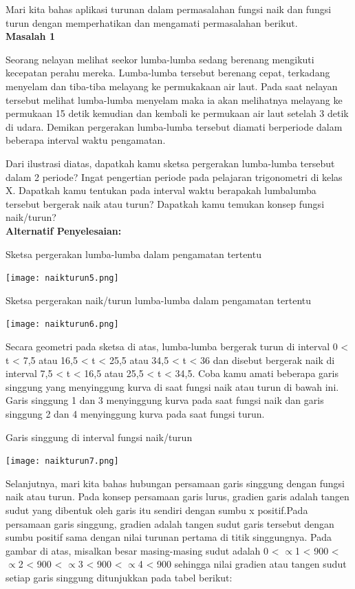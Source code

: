 \documentclass[11pt,fleqn]{book} %
\begin{document}
Mari kita bahas aplikasi turunan dalam permasalahan fungsi naik dan fungsi turun dengan memperhatikan dan mengamati permasalahan berikut.\\

\textbf{Masalah 1}

Seorang nelayan melihat seekor lumba-lumba sedang berenang mengikuti kecepatan perahu mereka. Lumba-lumba tersebut berenang cepat, terkadang menyelam dan tiba-tiba melayang ke permukakaan air laut. Pada saat nelayan tersebut melihat lumba-lumba menyelam maka ia akan melihatnya melayang ke permukaan 15 detik kemudian dan kembali ke permukaan air laut setelah 3 detik di udara. Demikan pergerakan lumba-lumba tersebut diamati berperiode dalam beberapa interval waktu pengamatan.

Dari ilustrasi diatas, dapatkah kamu sketsa pergerakan lumba-lumba tersebut dalam 2 periode? Ingat pengertian periode pada pelajaran trigonometri di kelas X. Dapatkah kamu tentukan pada interval waktu berapakah lumbalumba tersebut bergerak naik atau turun? Dapatkah kamu temukan konsep fungsi naik/turun?\\

\textbf{Alternatif Penyelesaian:}

Sketsa pergerakan lumba-lumba dalam pengamatan tertentu

\texttt{[image: naikturun5.png]}

Sketsa pergerakan naik/turun lumba-lumba dalam pengamatan tertentu

\texttt{[image: naikturun6.png]}

Secara geometri pada sketsa di atas, lumba-lumba bergerak turun di interval 0 < t < 7,5 atau 16,5 < t < 25,5 atau 34,5 < t < 36 dan disebut bergerak naik di interval 7,5 < t < 16,5 atau 25,5 < t < 34,5.
Coba kamu amati beberapa garis singgung yang menyinggung kurva di saat fungsi naik atau turun di bawah ini. Garis singgung 1 dan 3 menyinggung kurva pada saat fungsi naik dan garis singgung 2 dan 4 menyinggung kurva pada saat fungsi turun.

Garis singgung di interval fungsi naik/turun

\texttt{[image: naikturun7.png]}

Selanjutnya, mari kita bahas hubungan persamaan garis singgung dengan fungsi naik atau turun. Pada konsep
persamaan garis lurus, gradien garis adalah tangen sudut yang dibentuk oleh garis itu sendiri dengan sumbu x positif.Pada persamaan garis singgung, gradien adalah tangen sudut garis tersebut dengan sumbu positif sama dengan nilai turunan pertama di titik singgungnya. Pada gambar di atas, misalkan besar masing-masing sudut adalah 0 < $\propto $1 < 900 < $\propto $2 < 900 < $\propto $3 < 900 < $\propto $4 < 900 sehingga nilai
gradien atau tangen sudut setiap garis singgung ditunjukkan pada tabel berikut:
\end{document}
